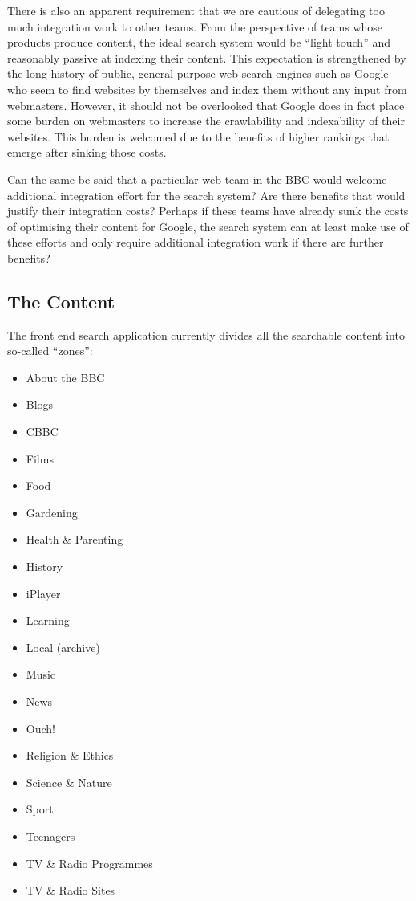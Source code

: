 There is also an apparent requirement that we are cautious of delegating
too much integration work to other teams. From the perspective of teams
whose products produce content, the ideal search system would be
``light touch'' and reasonably passive at indexing their content. This
expectation is strengthened by the long history of public, general-purpose
web search engines such as Google who seem to find websites by themselves
and index them without any input from webmasters. However, it should
not be overlooked that Google does in fact place some burden on webmasters
to increase the crawlability and indexability of their websites. This
burden is welcomed due to the benefits of higher rankings that emerge
after sinking those costs.

Can the same be said that a particular web team
in the BBC would welcome additional integration effort for the search system?
Are there benefits that would justify their integration costs? Perhaps if
these teams have already sunk the costs of optimising their content for
Google, the search system can at least make use of these efforts and only
require additional integration work if there are further benefits?

\subsection{The Content}

The front end search application currently divides all the searchable
content into so-called ``zones'':

\begin{itemize}
  \item About the BBC
  \item Blogs
  \item CBBC
  \item Films
  \item Food
  \item Gardening
  \item Health \& Parenting 
  \item History
  \item iPlayer
  \item Learning
  \item Local (archive)
  \item Music
  \item News
  \item Ouch!
  \item Religion \& Ethics
  \item Science \& Nature
  \item Sport
  \item Teenagers
  \item TV \& Radio Programmes
  \item TV \& Radio Sites
\end{itemize}

